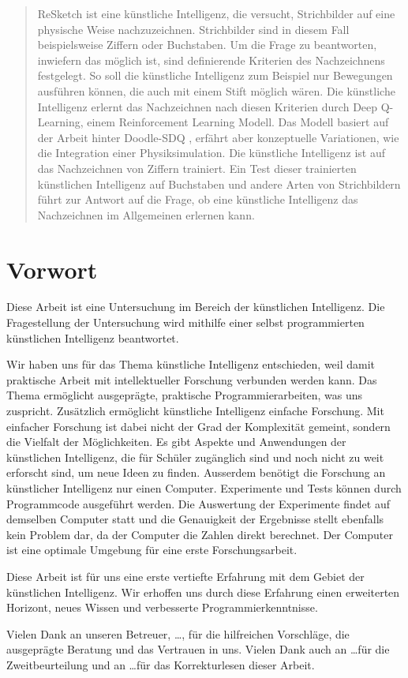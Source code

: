 \begin{abstract}\label{abstract} ReSketch ist eine künstliche Intelligenz, die
versucht, Strichbilder auf eine physische Weise nachzuzeichnen. Strichbilder
sind in diesem Fall beispielsweise Ziffern oder Buchstaben. Um die Frage zu
beantworten, inwiefern das möglich ist, sind definierende Kriterien des
Nachzeichnens festgelegt. So soll die künstliche Intelligenz zum Beispiel nur
Bewegungen ausführen können, die auch mit einem Stift möglich wären. Die
künstliche Intelligenz erlernt das Nachzeichnen nach diesen Kriterien durch Deep
Q-Learning, einem Reinforcement Learning Modell. Das Modell basiert auf der
Arbeit hinter Doodle-SDQ \cite{zhou_learning_2018}, erfährt aber konzeptuelle
Variationen, wie die Integration einer Physiksimulation. Die künstliche
Intelligenz ist auf das Nachzeichnen von Ziffern trainiert. Ein Test dieser
trainierten künstlichen Intelligenz auf Buchstaben und andere Arten von
Strichbildern führt zur Antwort auf die Frage, ob eine künstliche Intelligenz
das Nachzeichnen im Allgemeinen erlernen kann.
\end{abstract}
    
\newpage
    
\section*{Vorwort}\label{vorwort} Diese Arbeit ist eine Untersuchung im Bereich
der künstlichen Intelligenz. Die Fragestellung der Untersuchung wird mithilfe
einer selbst programmierten künstlichen Intelligenz beantwortet.
    
Wir haben uns für das Thema künstliche Intelligenz entschieden, weil damit
praktische Arbeit mit intellektueller Forschung verbunden werden kann. Das Thema
ermöglicht ausgeprägte, praktische Programmierarbeiten, was uns zuspricht.
Zusätzlich ermöglicht künstliche Intelligenz einfache Forschung. Mit einfacher
Forschung ist dabei nicht der Grad der Komplexität gemeint, sondern die Vielfalt
der Möglichkeiten. Es gibt Aspekte und Anwendungen der künstlichen Intelligenz,
die für Schüler zugänglich sind und noch nicht zu weit erforscht sind, um neue
Ideen zu finden. Ausserdem benötigt die Forschung an künstlicher Intelligenz nur
einen Computer. Experimente und Tests können durch Programmcode ausgeführt
werden. Die Auswertung der Experimente findet auf demselben Computer statt und
die Genauigkeit der Ergebnisse stellt ebenfalls kein Problem dar, da der
Computer die Zahlen direkt berechnet. Der Computer ist eine optimale Umgebung
für eine erste Forschungsarbeit.
    
Diese Arbeit ist für uns eine erste vertiefte Erfahrung mit dem Gebiet der
künstlichen Intelligenz. Wir erhoffen uns durch diese Erfahrung einen
erweiterten Horizont, neues Wissen und verbesserte Programmierkenntnisse.
    
Vielen Dank an unseren Betreuer, \dots, für die hilfreichen
Vorschläge, die ausgeprägte Beratung und das Vertrauen in uns. Vielen Dank auch
an \dots für die Zweitbeurteilung und an \dots für das
Korrekturlesen dieser Arbeit.
    
